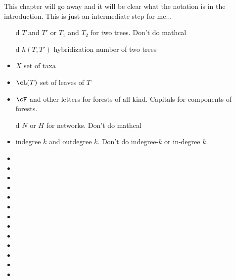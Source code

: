 This chapter will go away and it will be clear what the notation is in the introduction. This is just an intermediate step for me...


\begin{itemize}
 \item[d] $T$ and $T'$ or $T_1$ and $T_2$ for two trees. Don't do mathcal
 \item[d] $h(T,T')$ hybridization number of two trees
 \item $X$ set of taxa
 \item $\cL(T)$ set of leaves of $T$
 \item $\cF$ and other letters for forests of all kind. Capitals for components of forests.
 \item[d] $N$ or $H$ for networks. Don't do mathcal
 \item indegree $k$ and outdegree $k$. Don't do indegree-$k$ or in-degree $k$.
 \item 
 \item 
 \item 
 \item 
 \item 
 \item 
 \item 
 \item 
 \item 
 \item 
 \item 
 \item 
 \item 
\end{itemize}
